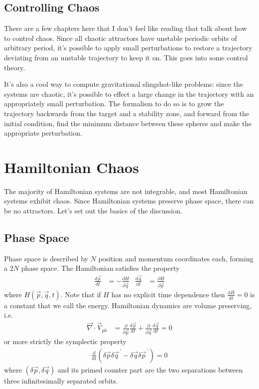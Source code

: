 \documentclass[12pt]{article}
\newcommand{\rd}[2]{\frac{\mathrm{d}#1}{\mathrm{d}#2}}
\newcommand{\pd}[2]{\frac{\partial#1}{\partial#2}}
\newcommand{\pvec}[1]{\vec{#1}^{\,\prime}}
\begin{document}
\subsection{Controlling Chaos}

There are a few chapters here that I don't feel like reading that talk about how
to control chaos. Since all chaotic attractors have unstable periodic orbits of
arbitrary period, it's possible to apply small perturbations to restore a
trajectory deviating from an unstable trajectory to keep it on. This goes into
some control theory.

It's also a cool way to compute gravitational slingshot-like problems: since the
systems are chaotic, it's possible to effect a large change in the trajectory
with an appropriately small perturbation. The formalism to do so is to grow the
trajectory backwards from the target and a stability zone, and forward from the
initial condition, find the minimum distance between these spheres and make the
appropriate perturbation.

\clearpage

\section{Hamiltonian Chaos}

The majority of Hamiltonian systems are not integrable, and most Hamiltonian
systems exhibit chaos. Since Hamiltonian systems preserve phase space, there can
be no attractors. Let's set out the basics of the discussion.

\subsection{Phase Space}

Phase space is described by $N$ position and momentum coordinates each, forming
a $2N$ phase space. The Hamiltonian satisfies the property
\begin{align}
    \rd{\vec{p}}{t} &= -\pd{H}{\vec{q}} & \rd{\vec{q}}{t} &= \pd{H}{\vec{p}}
\end{align}
where $H(\vec{p}, \vec{q}, t)$. Note that if $H$ has no explicit time dependence
then $\rd{H}{t} = 0$ is a constant that we call the energy. Hamiltonian dynamics
are volume preserving, i.e.
\begin{align}
    \vec{\nabla} \cdot \vec{V}_{ph} &= \pd{}{\vec{p}}\rd{\vec{p}}{t} +
        \pd{}{\vec{q}}\rd{\vec{q}}{t} = 0
\end{align}
or more strictly the symplectic property
\begin{align}
    \rd{}{t}\left( \delta \vec{p} \delta\pvec{q} -
        \delta \vec{q} \delta \pvec{p}\right) = 0
\end{align}
where $(\delta \vec{p}, \delta \vec{q})$ and its primed counter part are the two
separations between three infinitesimally separated orbits.
\end{document}
